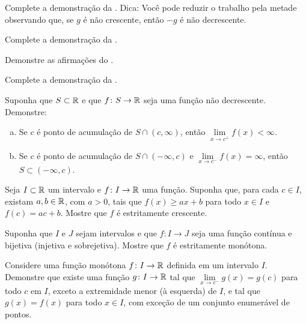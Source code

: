 \begin{exercise}
Complete a demonstração da .
Dica: Você pode reduzir o trabalho pela metade observando que, se $g$ é não crescente,
então $-g$ é não decrescente.
\end{exercise}

\begin{exercise}
Complete a demonstração da .
\end{exercise}

\begin{exercise}
Demonstre as afirmações do .
\end{exercise}

\begin{exercise}
Complete a demonstração da .
\end{exercise}

\begin{samepage}
\begin{exercise}
Suponha que $S \subset {\mathbb{R}}$ e que $f \colon S \to {\mathbb{R}}$ seja uma função não decrescente.
Demonstre:
\begin{enumerate}[a)]
\item
Se $c$ é ponto de acumulação de
$S \cap (c,\infty)$, então
$\lim\limits_{x\to c^+} f(x) < \infty$.
\item
Se $c$ é ponto de acumulação de $S \cap (-\infty,c)$
e $\lim\limits_{x\to c^-} f(x) = \infty$, então
$S \subset (-\infty,c)$.
\end{enumerate}
\end{exercise}
\end{samepage}

\begin{exercise}
Seja $I \subset {\mathbb{R}}$ um intervalo e $f \colon I \to {\mathbb{R}}$ uma função.
Suponha que, para cada $c \in I$, existam $a, b \in {\mathbb{R}}$, com
$a > 0$, tais que $f(x) \geq a x + b$ para todo $x \in I$
e $f(c) = a c + b$. Mostre que $f$ é estritamente crescente.
\end{exercise}

\begin{exercise}
Suponha que $I$ e $J$ sejam intervalos e que
$f \colon I \to J$ seja uma função contínua e bijetiva (injetiva e sobrejetiva).
Mostre que $f$ é estritamente monótona.
\end{exercise}

\begin{exercise}
Considere uma função monótona $f \colon I \to {\mathbb{R}}$ definida em um intervalo $I$.
Demonstre que existe uma função $g \colon I \to {\mathbb{R}}$ tal que
$\lim\limits_{x \to c^-} g(x) = g(c)$ para todo $c$ em $I$, exceto a
extremidade menor (à esquerda) de $I$, e tal que
$g(x) = f(x)$ para todo $x \in I$, com exceção de um conjunto enumerável de pontos.
\end{exercise}

